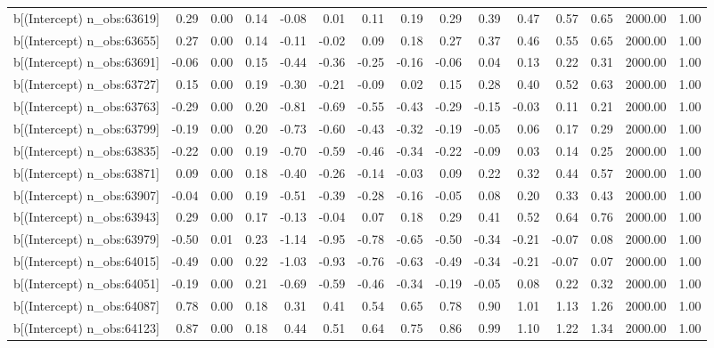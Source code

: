 \begin{table}[ht]
\begin{tabular}{rrrrrrrrrrrrrrr}
  b[(Intercept) n\_obs:63619] & 0.29 & 0.00 & 0.14 & -0.08 & 0.01 & 0.11 & 0.19 & 0.29 & 0.39 & 0.47 & 0.57 & 0.65 & 2000.00 & 1.00 \\ 
  b[(Intercept) n\_obs:63655] & 0.27 & 0.00 & 0.14 & -0.11 & -0.02 & 0.09 & 0.18 & 0.27 & 0.37 & 0.46 & 0.55 & 0.65 & 2000.00 & 1.00 \\ 
  b[(Intercept) n\_obs:63691] & -0.06 & 0.00 & 0.15 & -0.44 & -0.36 & -0.25 & -0.16 & -0.06 & 0.04 & 0.13 & 0.22 & 0.31 & 2000.00 & 1.00 \\ 
  b[(Intercept) n\_obs:63727] & 0.15 & 0.00 & 0.19 & -0.30 & -0.21 & -0.09 & 0.02 & 0.15 & 0.28 & 0.40 & 0.52 & 0.63 & 2000.00 & 1.00 \\ 
  b[(Intercept) n\_obs:63763] & -0.29 & 0.00 & 0.20 & -0.81 & -0.69 & -0.55 & -0.43 & -0.29 & -0.15 & -0.03 & 0.11 & 0.21 & 2000.00 & 1.00 \\ 
  b[(Intercept) n\_obs:63799] & -0.19 & 0.00 & 0.20 & -0.73 & -0.60 & -0.43 & -0.32 & -0.19 & -0.05 & 0.06 & 0.17 & 0.29 & 2000.00 & 1.00 \\ 
  b[(Intercept) n\_obs:63835] & -0.22 & 0.00 & 0.19 & -0.70 & -0.59 & -0.46 & -0.34 & -0.22 & -0.09 & 0.03 & 0.14 & 0.25 & 2000.00 & 1.00 \\ 
  b[(Intercept) n\_obs:63871] & 0.09 & 0.00 & 0.18 & -0.40 & -0.26 & -0.14 & -0.03 & 0.09 & 0.22 & 0.32 & 0.44 & 0.57 & 2000.00 & 1.00 \\ 
  b[(Intercept) n\_obs:63907] & -0.04 & 0.00 & 0.19 & -0.51 & -0.39 & -0.28 & -0.16 & -0.05 & 0.08 & 0.20 & 0.33 & 0.43 & 2000.00 & 1.00 \\ 
  b[(Intercept) n\_obs:63943] & 0.29 & 0.00 & 0.17 & -0.13 & -0.04 & 0.07 & 0.18 & 0.29 & 0.41 & 0.52 & 0.64 & 0.76 & 2000.00 & 1.00 \\ 
  b[(Intercept) n\_obs:63979] & -0.50 & 0.01 & 0.23 & -1.14 & -0.95 & -0.78 & -0.65 & -0.50 & -0.34 & -0.21 & -0.07 & 0.08 & 2000.00 & 1.00 \\ 
  b[(Intercept) n\_obs:64015] & -0.49 & 0.00 & 0.22 & -1.03 & -0.93 & -0.76 & -0.63 & -0.49 & -0.34 & -0.21 & -0.07 & 0.07 & 2000.00 & 1.00 \\ 
  b[(Intercept) n\_obs:64051] & -0.19 & 0.00 & 0.21 & -0.69 & -0.59 & -0.46 & -0.34 & -0.19 & -0.05 & 0.08 & 0.22 & 0.32 & 2000.00 & 1.00 \\ 
  b[(Intercept) n\_obs:64087] & 0.78 & 0.00 & 0.18 & 0.31 & 0.41 & 0.54 & 0.65 & 0.78 & 0.90 & 1.01 & 1.13 & 1.26 & 2000.00 & 1.00 \\ 
  b[(Intercept) n\_obs:64123] & 0.87 & 0.00 & 0.18 & 0.44 & 0.51 & 0.64 & 0.75 & 0.86 & 0.99 & 1.10 & 1.22 & 1.34 & 2000.00 & 1.00 \\ 

\end{tabular}
\end{table}
